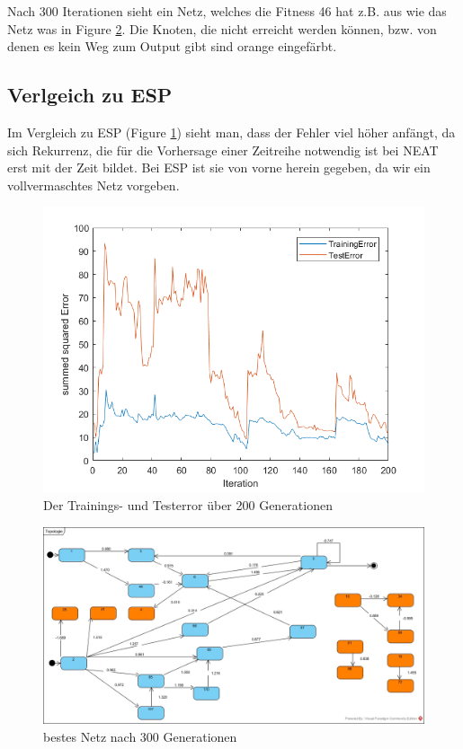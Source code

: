 \documentclass{hbrs-ecta-report}
\begin{document}
Nach 300 Iterationen sieht ein Netz, welches die Fitness 46 hat z.B. aus wie das Netz was in Figure \ref{fig:BeispielTopologie}. Die Knoten, die nicht erreicht werden können, bzw. von denen es kein Weg zum Output gibt sind orange eingefärbt.


\subsection{Verlgeich zu ESP}
Im Vergleich zu ESP (Figure \ref{fig:ESP}) sieht man, dass der Fehler viel höher anfängt, da sich Rekurrenz, die für die Vorhersage einer Zeitreihe notwendig ist bei NEAT erst mit der Zeit bildet. Bei ESP ist sie von vorne herein gegeben, da wir ein vollvermaschtes Netz vorgeben.\\
\begin{figure}[h!]
	\includegraphics[width=\linewidth]{img/ESP2}
	\caption{Der Trainings- und Testerror über 200 Generationen}
	\label{fig:ESP}
\end{figure}
\newpage
\begin{figure}[t!]
	\includegraphics[width=2\linewidth]{img/BeispielTopologie}
	\caption{bestes Netz nach 300 Generationen}
	\label{fig:BeispielTopologie}
\end{figure}
\end{document}
